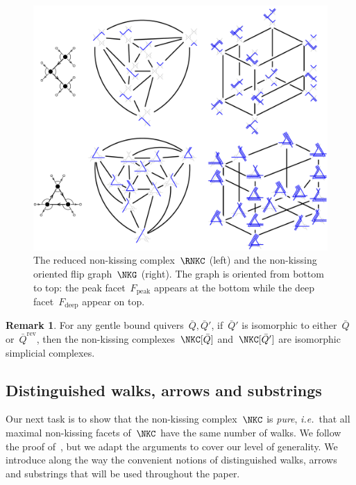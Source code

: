\documentclass{amsart}
\theoremstyle{definition}
\newtheorem{remark}[theorem]{Remark}
\newcommand{\ie}{\textit{i.e.}~} %
\newcommand{\darkblue}{\color{darkblue}} %
\newcommand{\defn}[1]{\textsl{\darkblue #1}} %
\newcommand{\peak}{\mathrm{peak}} %
\newcommand{\deep}{\mathrm{deep}} %
\newcommand{\reversed}[1]{#1^{\mathrm{rev}}} %
\begin{document}
\begin{figure}[t]
	\capstart
	\centerline{\includegraphics[scale=.5]{exmNKC}}
	\caption{The reduced non-kissing complex~$\RNKC$ (left) and the non-kissing oriented flip graph~$\NKG$ (right). The graph is oriented from bottom to top: the peak facet~$F_\peak$ appears at the bottom while the deep facet~$F_\deep$ appear on top.}
	\label{fig:exmNKC}
\end{figure}

\begin{remark}
\label{rem:reverseNKC}
For any gentle bound quivers~$\bar Q, \bar Q'$, if~$\bar Q'$ is isomorphic to either~$\bar Q$ or~$\reversed{\bar Q}$, then the non-kissing complexes~$\NKC[\bar Q]$ and~$\NKC[\bar Q']$ are isomorphic simplicial complexes.
\end{remark}

\subsection{Distinguished walks, arrows and substrings}
\label{subsec:distinguished}

Our next task is to show that the non-kissing complex~$\NKC$ is \defn{pure}, \ie that all maximal non-kissing facets of~$\NKC$ have the same number of walks.
We follow the proof of~\cite[Thm~3.2\,(1--2)]{McConville}, but we adapt the arguments to cover our level of generality.
We introduce along the way the convenient notions of distinguished walks, arrows and substrings that will be used throughout the paper.
\end{document}
